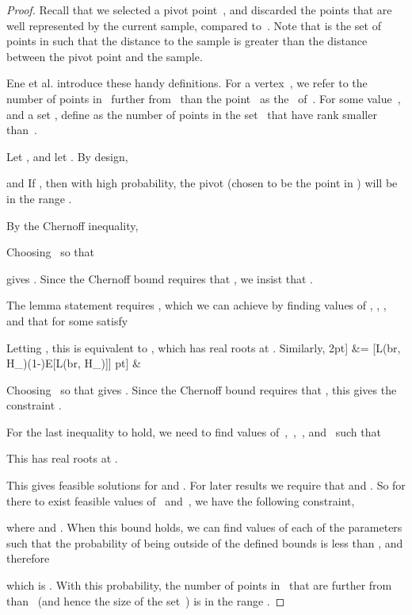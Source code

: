 \documentclass[11pt]{article}
\begin{document}
\begin{proof}
\label{chernoff-proof}
Recall that we selected a pivot point~, and discarded the points that are well represented by the current sample, compared to~. 
Note that  is the set of points in  such that the distance to the sample  is greater than the distance between the pivot point and the sample.

Ene et al. introduce these handy definitions.
For a vertex~, we refer to the number of points in~ further
from~ than the point~ as the~
of~. 
For some value~, and a set ,
define 
as the number of points in the set~ that have rank smaller than~. 


\noindent
Let , and let .  
By design,

and 
If , then with high probability, the pivot
(chosen to be the   point in ) will be in the range .


\noindent
By the Chernoff inequality, 

\vspace{-2mm}
 
\noindent
Choosing~ so that

gives . 
Since the Chernoff bound requires that ,
we insist that .

The lemma statement requires , which we can achieve by finding values
of , , , and   that for some  satisfy

Letting , this is equivalent to , which has real roots at .
Similarly, 
2pt]
  &= [L(b\cdot r, H_\ell)\leq(1-\delta)E[L(b\cdot r, H_\ell)]] \2pt]
 & \leq \exp{} \
\vspace{-2mm}
  
  
Choosing~ so that  gives .
 Since the Chernoff bound requires that , this gives the
constraint .

For the last inequality to hold,
we need to find values of~,~,~, and~ such that  

This has real roots at .

This gives feasible solutions for  and .
For later results we require that  and . 
So for there to exist feasible values of~ and~, we have the following constraint,

where  and .
When this bound holds, we can find values of each of the parameters such that the probability of  being outside of the defined bounds is less than , and 
therefore 

which is .
With this probability,
the number of points in~ that are further from~ than~
(and hence the size of the set~)
is in the range .
\end{proof}
\end{document}
